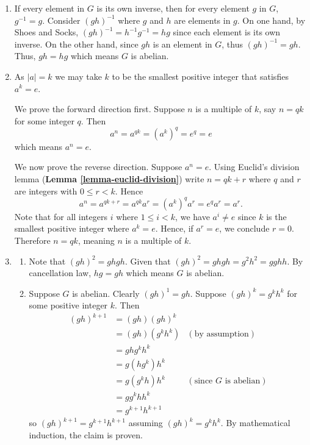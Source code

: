 \begin{enumerate}
    \item If every element in $G$ is its own inverse, then for every element $g$ in $G$, $g^{-1} = g$. Consider $(gh)^{-1}$ where $g$ and $h$ are elements in $g$. On one hand, by Shoes and Socks, $(gh)^{-1} = h^{-1}g^{-1} = hg$ since each element is its own inverse. On the other hand, since $gh$ is an element in $G$, thus $(gh)^{-1} = gh$. Thus, $gh = hg$ which means $G$ is abelian.
    
    \item As $|a| = k$ we may take $k$ to be the smallest positive integer that satisfies $a^k = e$.
    
    We prove the forward direction first. Suppose $n$ is a multiple of $k$, say $n = qk$ for some integer $q$. Then
    \[
        a^n = a^{qk} = \left(a^k\right)^q = e^q = e    
    \]
    which means $a^n = e$.
    
    We now prove the reverse direction. Suppose $a^n = e$. Using Euclid's division lemma (\textbf{Lemma \ref{lemma-euclid-division}}) write $n = qk + r$ where $q$ and $r$ are integers with $0 \leq r < k$. Hence
    \[
        a^n = a^{qk + r} = a^{qk}a^r = \left(a^k\right)^qa^r = e^qa^r = a^r.
    \]
    Note that for all integers $i$ where $1 \leq i < k$, we have $a^i \neq e$ since $k$ is the smallest positive integer where $a^k = e$. Hence, if $a^r = e$, we conclude $r = 0$. Therefore $n = qk$, meaning $n$ is a multiple of $k$.

    \item \begin{enumerate}[label=(\alph*)]
        \item Note that $(gh)^2 = ghgh$. Given that $(gh)^2 = ghgh = g^2h^2 = gghh$. By cancellation law, $hg = gh$ which means $G$ is abelian.
        \item Suppose $G$ is abelian. Clearly $(gh)^1 = gh$. Suppose $(gh)^{k} = g^kh^k$ for some positive integer $k$. Then
        \begin{align*}
            (gh)^{k+1} &= (gh)(gh)^k\\
            &= (gh)(g^kh^k) & (\text{by assumption})\\
            &= ghg^kh^k\\
            &= g(hg^k)h^k\\
            &= g(g^kh)h^k & (\text{since } G \text{ is abelian})\\
            &= gg^khh^k\\
            &= g^{k+1}h^{k+1}
        \end{align*}
        so $(gh)^{k+1} = g^{k+1}h^{k+1}$ assuming $(gh)^k = g^kh^k$. By mathematical induction, the claim is proven.
    \end{enumerate}


\end{enumerate}
